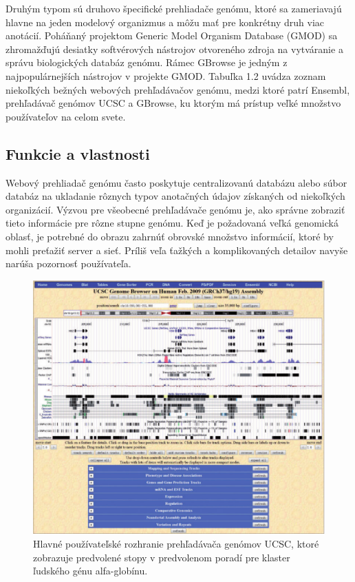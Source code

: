 Druhým typom sú druhovo špecifické prehliadače genómu, ktoré sa zameriavajú hlavne na jeden modelový organizmus a môžu mať pre konkrétny druh viac anotácií.
Poháňaný projektom Generic Model Organism Database (GMOD) sa zhromažďujú desiatky softvérových nástrojov otvoreného zdroja na vytváranie a správu biologických databáz genómu.
Rámec GBrowse \cite{GBrowse} je jedným z najpopulárnejších nástrojov v projekte GMOD.
Tabuľka 1.2 uvádza zoznam niekoľkých bežných webových prehľadávačov genómu, medzi ktoré patrí Ensembl, prehľadávač genómov UCSC a GBrowse, ku ktorým má prístup veľké množstvo používateľov na celom svete.

\subsection{Funkcie a vlastnosti}

Webový prehliadač genómu často poskytuje centralizovanú databázu alebo súbor databáz na ukladanie rôznych typov anotačných údajov získaných od niekoľkých organizácií.
Výzvou pre všeobecné prehľadávače genómu je, ako správne zobraziť tieto informácie pre rôzne stupne genómu.
Keď je požadovaná veľká genomická oblasť, je potrebné do obrazu zahrnúť obrovské množstvo informácií, ktoré by mohli preťažiť server a sieť.
Príliš veľa ťažkých a komplikovaných detailov navyše narúša pozornosť používateľa.

\begin{figure}[!ht]
	\centering
	\includegraphics[width=.9\textwidth]{figures/ucsc_gb.png}
	\caption{Hlavné používateľské rozhranie prehľadávača genómov UCSC, ktoré zobrazuje predvolené stopy v predvolenom poradí pre klaster ľudského génu alfa-globínu.\label{o:latex_friendly_zone}}
\end{figure}

